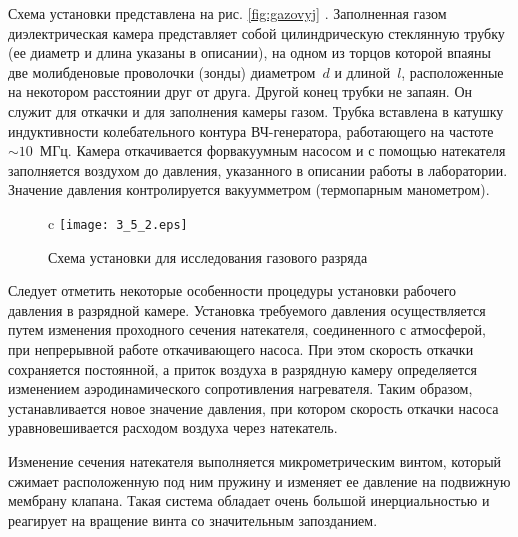 \experiment
Схема установки представлена на рис. \ref{fig:gazovyj} %
. Заполненная газом диэлектрическая камера представляет собой цилиндрическую
стеклянную трубку (ее диаметр и длина указаны в описании), на одном из торцов которой впаяны две молибденовые проволочки (зонды)
диаметром~$d$ и длиной~$l$, расположенные на некотором расстоянии друг от друга. Другой конец трубки не запаян.
Он служит для откачки и для заполнения камеры газом. Трубка вставлена в катушку индуктивности колебательного контура
ВЧ-генератора, работающего на частоте~$\sim10$~МГц. Камера откачивается форвакуумным насосом и с помощью натекателя
заполняется воздухом до давления, указанного в описании работы в лаборатории. Значение давления контролируется вакуумметром
(термопарным манометром).


\begin{figure}{c}
	\texttt{[image: 3\_5\_2.eps]}
	\caption{Схема установки для исследования газового разряда}
	\figmark[gazovyj]
\end{figure}


Следует отметить некоторые особенности процедуры установки рабочего давления в разрядной камере. Установка требуемого давления осуществляется путем изменения проходного сечения натекателя, соединенного с атмосферой, при непрерывной работе откачивающего насоса. При этом скорость откачки сохраняется постоянной, а приток воздуха в разрядную камеру определяется изменением аэродинамического сопротивления нагревателя. Таким образом, устанавливается новое значение давления, при котором скорость откачки насоса уравновешивается расходом воздуха через натекатель.

Изменение сечения натекателя выполняется микрометрическим винтом, который сжимает расположенную под ним пружину и изменяет ее давление на подвижную мембрану клапана. Такая система обладает очень большой инерциальностью и реагирует на вращение винта со значительным запозданием.
 
